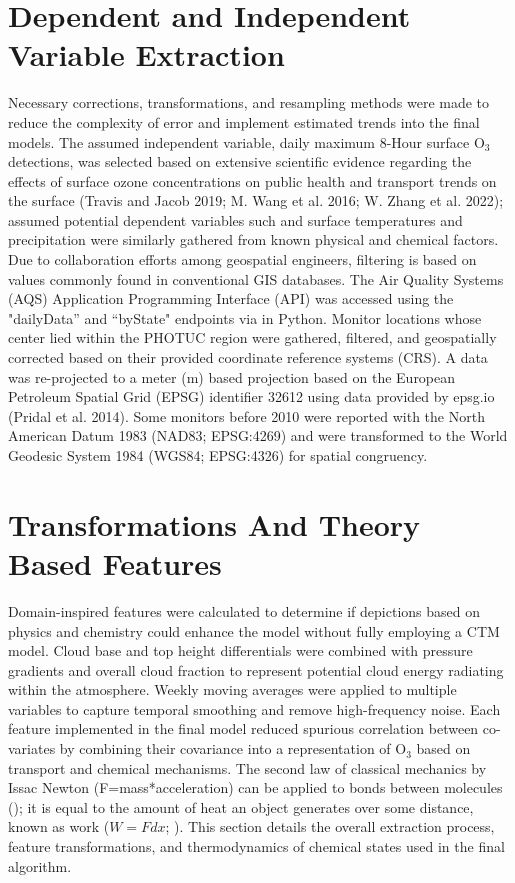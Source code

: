 \section{Dependent and Independent Variable Extraction} \label{methods:varextraction} Necessary corrections, transformations, and resampling methods were made to reduce the complexity of error and implement estimated trends into the final models. The assumed independent variable, daily maximum 8-Hour surface O$_3$ detections, was selected based on extensive scientific evidence regarding the effects of surface ozone concentrations on public health and transport trends on the surface (Travis and Jacob 2019; M. Wang et al. 2016; W. Zhang et al. 2022); assumed potential dependent variables such and surface temperatures and precipitation were similarly gathered from known physical and chemical factors. Due to collaboration efforts among geospatial engineers, filtering is based on values commonly found in conventional GIS databases. The Air Quality Systems (AQS) \parencite{epa_air_2025} Application Programming Interface (API) was accessed using the "dailyData” and “byState" endpoints via in Python. Monitor locations whose center lied within the PHOTUC region were gathered, filtered, and geospatially corrected based on their provided coordinate reference systems (CRS). A data was re-projected to a meter (m) based projection based on the European Petroleum Spatial Grid (EPSG) identifier 32612 using data provided by epsg.io (Pridal et al. 2014). Some monitors before 2010 were reported with the North American Datum 1983 (NAD83; EPSG:4269) and were transformed to the World Geodesic System 1984 (WGS84; EPSG:4326) for spatial congruency.
\section{Transformations And Theory Based Features} \label{methods:featsfm} Domain-inspired features were calculated to determine if depictions based on physics and chemistry could enhance the model without fully employing a CTM model. Cloud base and top height differentials were combined with pressure gradients and overall cloud fraction to represent potential cloud energy radiating within the atmosphere. Weekly moving averages were applied to multiple variables to capture temporal smoothing and remove high-frequency noise. Each feature implemented in the final model reduced spurious correlation between co-variates by combining their covariance into a representation of O$_3$ based on transport and chemical mechanisms. The second law of classical mechanics by Issac Newton (F=mass*acceleration) can be applied to bonds between molecules (\cite{taylor_classical_2005}); it is equal to the amount of heat an object generates over some distance, known as work ($W=Fdx$; \cite{borgnakke_fundamentals_2014}). This section details the overall extraction process, feature transformations, and thermodynamics of chemical states used in the final algorithm. 
